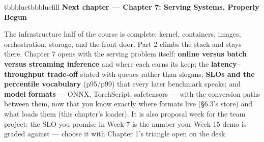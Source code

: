 \begin{calloutbox}{tbbblue}{tbbbluefill}
{\normalsize\bfseries\color{tbbblue}Next chapter — Chapter 7: Serving Systems, Properly Begun}\par\vspace{3pt}
The infrastructure half of the course is complete: kernel, containers, images, orchestration, storage, and the front door. Part 2 climbs the stack and stays there. Chapter 7 opens with the serving problem itself: \textbf{online versus batch versus streaming inference} and where each earns its keep; the \textbf{latency–throughput trade-off} stated with queues rather than slogans; \textbf{SLOs and the percentile vocabulary} (p95/p99) that every later benchmark speaks; and \textbf{model formats} — ONNX, TorchScript, safetensors — with the conversion paths between them, now that you know exactly where formats live (§6.3's store) and what loads them (this chapter's loader). It is also proposal week for the team project: the SLO you promise in Week 7 is the number your Week 15 demo is graded against — choose it with Chapter 1's triangle open on the desk.
\end{calloutbox}
